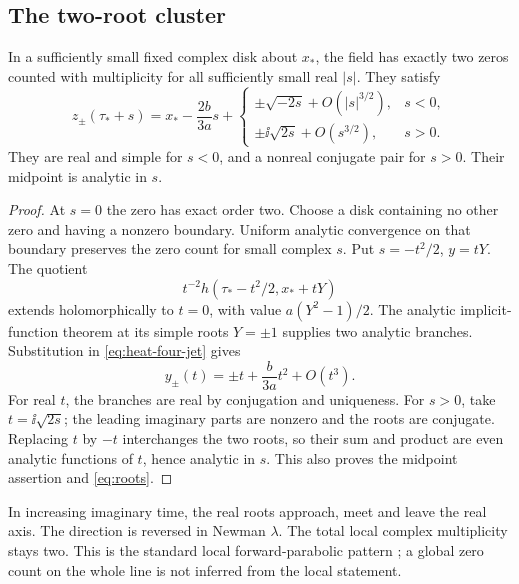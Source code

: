 \subsection{The two-root cluster}
\begin{theorem}\label{thm:splitting}
In a sufficiently small fixed complex disk about \(x_*\), the field
has exactly two zeros counted with multiplicity for all sufficiently
small real \(|s|\). They satisfy
\begin{equation}\label{eq:roots}
 z_\pm(\tau_*+s)=x_*-\frac{2b}{3a}s+
 \begin{cases}
  \displaystyle\pm\sqrt{-2s}+O(|s|^{3/2}),&s<0,\\[2pt]
  \displaystyle\pm\ii\sqrt{2s}+O(s^{3/2}),&s>0.
 \end{cases}
\end{equation}
They are real and simple for \(s<0\), and a nonreal conjugate pair for
\(s>0\). Their midpoint is analytic in \(s\).
\end{theorem}
\begin{proof}
At \(s=0\) the zero has exact order two. Choose a disk containing no
other zero and having a nonzero boundary. Uniform analytic convergence
on that boundary preserves the zero count for small complex \(s\).
Put \(s=-t^2/2\), \(y=tY\). The quotient
\[
 t^{-2}h(\tau_*-t^2/2,x_*+tY)
\]
extends holomorphically to \(t=0\), with value
\(a(Y^2-1)/2\). The analytic implicit-function theorem at its simple
roots \(Y=\pm1\) supplies two analytic branches. Substitution in
\eqref{eq:heat-four-jet} gives
\begin{equation}\label{eq:t-roots}
 y_\pm(t)=\pm t+\frac{b}{3a}t^2+O(t^3).
\end{equation}
For real \(t\), the branches are real by conjugation and uniqueness.
For \(s>0\), take \(t=\ii\sqrt{2s}\); the leading imaginary parts are
nonzero and the roots are conjugate. Replacing \(t\) by \(-t\)
interchanges the two roots, so their sum and product are even analytic
functions of \(t\), hence analytic in \(s\). This also proves the
midpoint assertion and \eqref{eq:roots}.
\end{proof}

In increasing imaginary time, the real roots approach, meet and leave
the real axis. The direction is reversed in Newman \(\lambda\).
The total local complex multiplicity stays two. This is the standard
local forward-parabolic pattern \cite{Angenent1991}; a global zero count
on the whole line is not inferred from the local statement.

